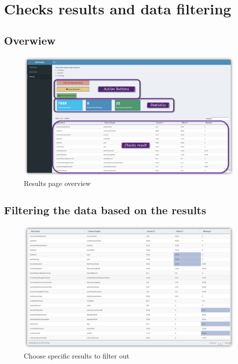 \documentclass[]{book}
\theoremstyle{definition}
\theoremstyle{definition}
\theoremstyle{definition}
\theoremstyle{remark}
\begin{document}
\section{Checks results and data
filtering}\label{checks-results-and-data-filtering}

\subsection{Overwiew}\label{overwiew}

\begin{figure}
\centering
\includegraphics{img/bdchecks_DC_results_overview.png}
\caption{Results page overview}
\end{figure}

\subsection{Filtering the data based on the
results}\label{filtering-the-data-based-on-the-results}

\begin{figure}
\centering
\includegraphics{img/bdchecks_filtering_table.png}
\caption{Choose specific results to filter out}
\end{figure}
\end{document}
